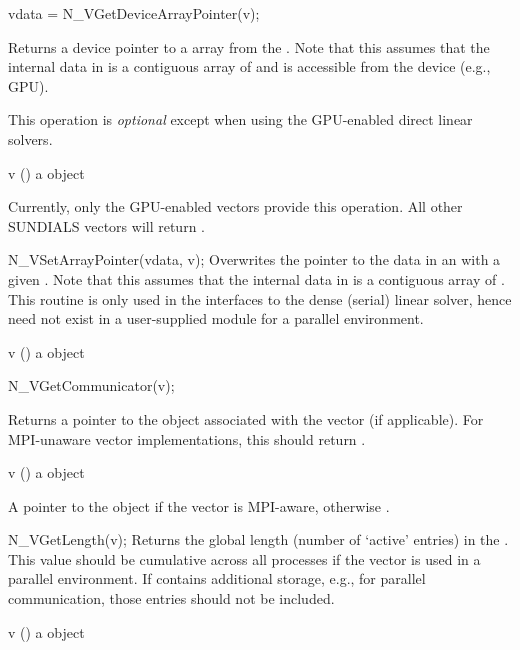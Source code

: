 {
  vdata = N\_VGetDeviceArrayPointer(v);
}
{
  Returns a device pointer to a  array from the 
  . Note that this assumes that the internal data in  is a
  contiguous array of  and is accessible from the device (e.g.,
  GPU).

  This operation is \textit{optional} except when using the GPU-enabled direct
  linear solvers.
}
{
  \begin{args}[v]
  \item[v] () a {\nvector} object
  \end{args}
}
{
}
{
  Currently, only the GPU-enabled {\sundials} vectors provide this operation.
  All other SUNDIALS vectors will return .
}

{
  N\_VSetArrayPointer(vdata, v);
}
{
  Overwrites the pointer to the data in an  with a given .
  Note that this assumes that the internal data in  is a contiguous
  array of . This routine is only used in the interfaces to the dense
  (serial) linear solver, hence need not exist in a user-supplied {\nvector} module
  for a parallel environment.
}
{
  \begin{args}[v]
  \item[v] () a {\nvector} object
  \end{args}
}
{}
{}

{
  N\_VGetCommunicator(v);
}
{

  Returns a pointer to the  object associated with the
  vector (if applicable). For MPI-unaware vector implementations, this
  should return .
}
{
  \begin{args}[v]
  \item[v] () a {\nvector} object
  \end{args}
}
{
  A  pointer to the  object if the vector is MPI-aware,
  otherwise .
}
{}

{
  N\_VGetLength(v);
}
{
  Returns the global length (number of `active' entries) in the
  {\nvector} .  This value should be cumulative across all
  processes if the vector is used in a parallel environment.  If 
  contains additional storage, e.g., for parallel communication, those
  entries should not be included.
}
{
  \begin{args}[v]
  \item[v] () a {\nvector} object
  \end{args}
}
{
}
{}

